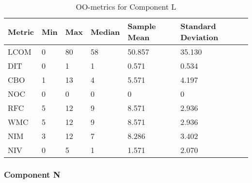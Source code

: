\begin{table}[]
\centering
\caption{OO-metrics for Component L}
\label{tab:oometrics-log}
\begin{tabular}{|l|l|l|l|l|l|}
\hline
\textbf{Metric} & \textbf{Min} & \textbf{Max} & \textbf{Median} & \textbf{Sample Mean} & \textbf{Standard Deviation} \\ \hline
LCOM            & 0            & 80           & 58              & 50.857               & 35.130                      \\ \hline
DIT             & 0            & 1            & 1               & 0.571                & 0.534                       \\ \hline
CBO             & 1            & 13           & 4               & 5.571                & 4.197                       \\ \hline
NOC             & 0            & 0            & 0               & 0                    & 0                           \\ \hline
RFC             & 5            & 12           & 9               & 8.571                & 2.936                       \\ \hline
WMC             & 5            & 12           & 9               & 8.571                & 2.936                       \\ \hline
NIM             & 3            & 12           & 7               & 8.286                & 3.402                       \\ \hline
NIV             & 0            & 5            & 1               & 1.571                & 2.070                       \\ \hline
\end{tabular}
\end{table}








\subsubsection{Component N}

